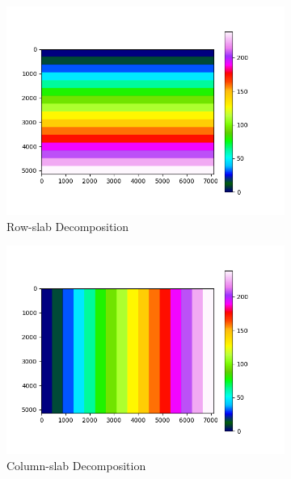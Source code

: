 \begin{figure}[h]
    \centering
    \begin{subfigure}{0.3\textwidth}
        \centering
        \includegraphics[width=\textwidth]{images/row_slab.png}
        \caption{Row-slab Decomposition}
        \label{fig:row-slab}
    \end{subfigure}
    \hfill
    \begin{subfigure}{0.3\textwidth}
        \centering
        \includegraphics[width=\textwidth]{images/column_slab.png}
        \caption{Column-slab Decomposition}
        \label{fig:column-slab}
    \end{subfigure}
    \hfill
    \begin{subfigure}{0.3\textwidth}

\end{subfigure}
\end{figure}
